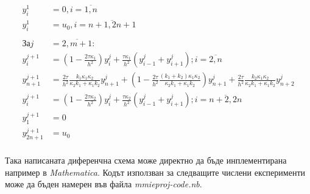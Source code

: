 \begin{align*}
    y_i^1 &= 0, i = \overline{1,n} \\
    y_i^{1} &= u_0, i = \overline{n+1, 2n+1} \\
    \\
    За j &= \overline{2,m+1}: \\
    y_{i}^{j+1} &= \left(1-\frac{2 \tau \kappa_1}{h^2}\right)y_{i}^j + \frac{\tau \kappa_1}{h^2}\left(y_{i-1}^j + y_{i+1}^j\right);  i  = \overline{2, n} \\
    y_{n+1}^{j+1} &= \frac{2 \tau}{h^2} \frac{k_1 \kappa_1 \kappa_2 }{\kappa_2 k_1 + \kappa_1 k_2} y_{n+1}^j + \left( 1 - \frac{2 \tau}{h^2}  \frac{(k_1 + k_2) \kappa_1 \kappa_2 }{\kappa_2 k_1 + \kappa_1 k_2} \right) y_{n+1}^j + \frac{2 \tau}{h^2} \frac{k_2 \kappa_1 \kappa_2 }{\kappa_2 k_1 + \kappa_1 k_2} y_{n+2}^j \\
    y_{i}^{j+1} &= \left(1-\frac{2 \tau \kappa_2}{h^2}\right)y_{i}^j + \frac{\tau \kappa_2}{h^2}\left(y_{i-1}^j + y_{i+1}^j\right);  i  = \overline{n+2, 2n} \\
    y_{1}^{j+1} &= 0  \\
    y_{2n+1}^{j+1} &= u_0 \\
\end{align*}

Така написаната диференчна схема може директно да бъде инплементирана например в \textit{Mathematica}. Кодът използван за следващите числени експерименти може да бъден намерен във файла \textit{mmieproj-code.nb}.